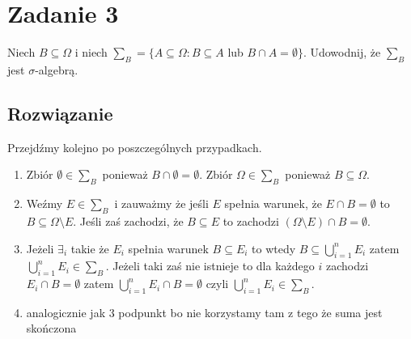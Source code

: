 \section{Zadanie 3}
Niech \(B\subseteq\Omega\) i niech \(\sum_B = \{ A\subseteq\Omega :B\subseteq A\) lub \(B\cap A = \emptyset\}\). Udowodnij, że \(\sum_B\)  jest \(\sigma\)-algebrą.
\subsection*{Rozwiązanie}
Przejdźmy kolejno po poszczególnych przypadkach.
\begin{enumerate}
	\item Zbiór \(\emptyset\in \sum_B\) ponieważ \(B\cap\emptyset=\emptyset\). Zbiór \(\Omega\in \sum_B\) ponieważ \(B\subseteq\Omega\).
	\item Weźmy \(E\in\sum_B\) i zauważmy że jeśli \(E\) spełnia warunek, że \(E\cap B = \emptyset\) to \(B\subseteq\Omega\setminus E\). Jeśli zaś zachodzi, że \(B\subseteq E\) to zachodzi \((\Omega\setminus E)\cap B = \emptyset\).
	\item Jeżeli \(\exists_i\) takie że \(E_i\) spełnia warunek \(B\subseteq E_i\) to wtedy \(B\subseteq \bigcup_{i=1}^n E_i\) zatem \(\bigcup_{i=1}^n E_i \in \sum_B\). Jeżeli taki zaś nie istnieje to dla każdego \(i\) zachodzi \(E_i\cap B=\emptyset\) zatem \(\bigcup_{i=1}^n E_i \cap B=\emptyset\) czyli \(\bigcup_{i=1}^n E_i\in\sum_B\).
	\item analogicznie jak 3 podpunkt bo nie korzystamy tam z tego że suma jest skończona
\end{enumerate}
